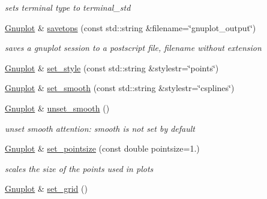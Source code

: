 \begin{DoxyCompactItemize}
\begin{DoxyCompactList}\small\item\em sets terminal type to terminal\-\_\-std \end{DoxyCompactList}\item 
\hypertarget{class_gnuplot_a032072c7c01b508a7535a17fb08562b1}{\hyperlink{class_gnuplot}{Gnuplot} \& \hyperlink{class_gnuplot_a032072c7c01b508a7535a17fb08562b1}{savetops} (const std\-::string \&filename=\char`\"{}gnuplot\-\_\-output\char`\"{})}\label{class_gnuplot_a032072c7c01b508a7535a17fb08562b1}

\begin{DoxyCompactList}\small\item\em saves a gnuplot session to a postscript file, filename without extension \end{DoxyCompactList}\item 
\hyperlink{class_gnuplot}{Gnuplot} \& \hyperlink{class_gnuplot_acfdcda292650775ebed4683e8e1515b5}{set\-\_\-style} (const std\-::string \&stylestr=\char`\"{}points\char`\"{})
\item 
\hyperlink{class_gnuplot}{Gnuplot} \& \hyperlink{class_gnuplot_aa18386919da2ec4c994f1f9c7195d384}{set\-\_\-smooth} (const std\-::string \&stylestr=\char`\"{}csplines\char`\"{})
\item 
\hyperlink{class_gnuplot}{Gnuplot} \& \hyperlink{class_gnuplot_ad9dfbccd66dece1dbe5803605c6ab08c}{unset\-\_\-smooth} ()
\begin{DoxyCompactList}\small\item\em unset smooth attention\-: smooth is not set by default \end{DoxyCompactList}\item 
\hypertarget{class_gnuplot_a95ec1636a871447dfe99463b769339c7}{\hyperlink{class_gnuplot}{Gnuplot} \& \hyperlink{class_gnuplot_a95ec1636a871447dfe99463b769339c7}{set\-\_\-pointsize} (const double pointsize=1.)}\label{class_gnuplot_a95ec1636a871447dfe99463b769339c7}

\begin{DoxyCompactList}\small\item\em scales the size of the points used in plots \end{DoxyCompactList}\item 
\hypertarget{class_gnuplot_a5416c8e81f1b9945b9631fa85a8d4f47}{\hyperlink{class_gnuplot}{Gnuplot} \& \hyperlink{class_gnuplot_a5416c8e81f1b9945b9631fa85a8d4f47}{set\-\_\-grid} ()}\label{class_gnuplot_a5416c8e81f1b9945b9631fa85a8d4f47}


\end{DoxyCompactItemize}
